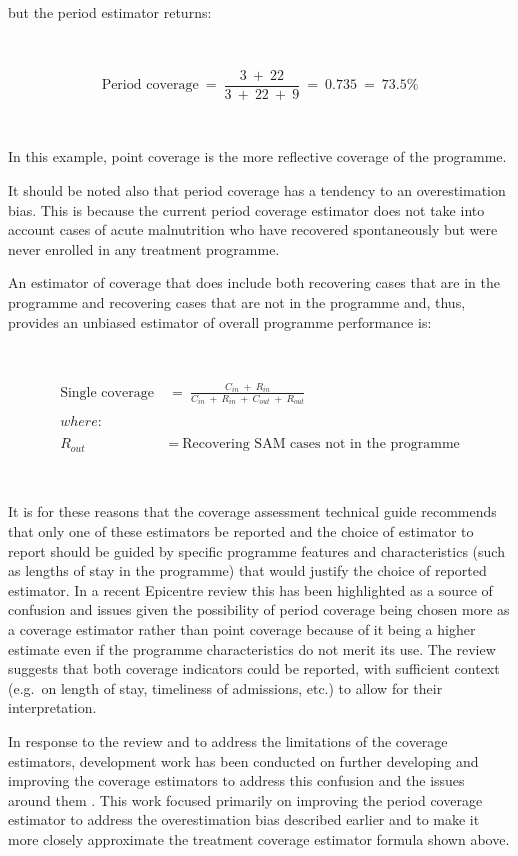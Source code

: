 \documentclass[12pt,a4paper]{book}
\theoremstyle{definition}
\theoremstyle{definition}
\theoremstyle{definition}
\theoremstyle{remark}
\begin{document}
~

but the period estimator returns:

~

\[ \text{Period coverage} ~ = ~ \frac{3 ~ + ~ 22}{3 ~ + ~ 22 ~ + ~ 9} ~ = ~ 0.735 ~ = ~ 73.5\% \]

~

In this example, point coverage is the more reflective coverage of the
programme.

It should be noted also that period coverage has a tendency to an
overestimation bias. This is because the current period coverage
estimator does not take into account cases of acute malnutrition who
have recovered spontaneously but were never enrolled in any treatment
programme.

An estimator of coverage that does include both recovering cases that
are in the programme and recovering cases that are not in the programme
and, thus, provides an unbiased estimator of overall programme
performance is:

~

\[\begin{aligned}
\text{Single coverage} & ~ = ~ \frac{C_{in} ~ + ~ R_{in}}{C_{in} ~ + ~ R_{in} ~ + ~ C_{out} ~ + ~ R_{out}} \\
\\
where: & \\
\\
R_{out} & ~ = ~ \text{Recovering SAM cases not in the programme}
\end{aligned}\]

~

It is for these reasons that the coverage assessment technical guide
\citep{Myatt:2012tt} recommends that only one of these estimators be
reported and the choice of estimator to report should be guided by
specific programme features and characteristics (such as lengths of stay
in the programme) that would justify the choice of reported estimator.
In a recent Epicentre review \citep{Epicentre:2015ty} this has been
highlighted as a source of confusion and issues given the possibility of
period coverage being chosen more as a coverage estimator rather than
point coverage because of it being a higher estimate even if the
programme characteristics do not merit its use. The review suggests that
both coverage indicators could be reported, with sufficient context
(e.g.~on length of stay, timeliness of admissions, etc.) to allow for
their interpretation.

In response to the review and to address the limitations of the coverage
estimators, development work has been conducted on further developing
and improving the coverage estimators to address this confusion and the
issues around them \citep{Balegamire:2015ud}. This work focused
primarily on improving the period coverage estimator to address the
overestimation bias described earlier and to make it more closely
approximate the treatment coverage estimator formula shown above.
\end{document}
